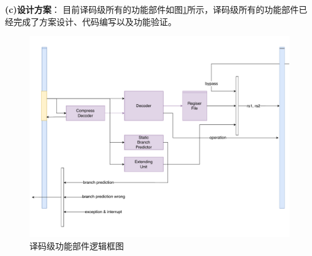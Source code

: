 \documentclass[a4paper, 12pt]{article}
\begin{document}
\textbf{(c)设计方案}：
  目前译码级所有的功能部件如图\ref{fig:id_top}所示，译码级所有的功能部件已经完成了方案设计、代码编写以及功能验证。
  \begin{figure}[htbp]
    \centering
    \includegraphics[width=0.8\linewidth]{./images/id_top.pdf}
    \caption{译码级功能部件逻辑框图}
    \label{fig:id_top}
  \end{figure}
\end{document}
